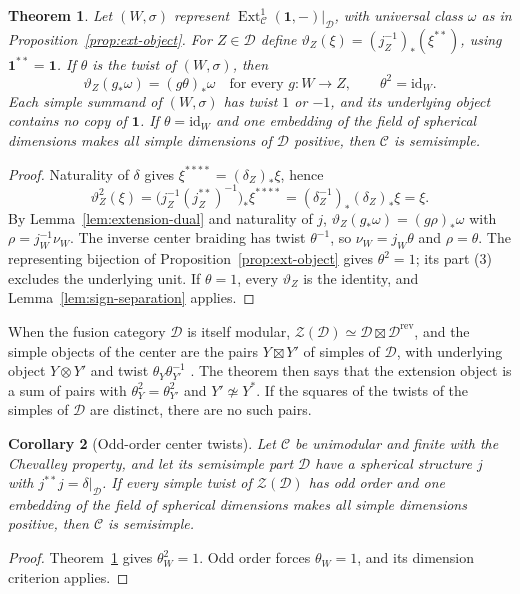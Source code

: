 \documentclass[11pt,reqno]{amsart}
\newtheorem{theorem}{Theorem}[section]
\newtheorem{corollary}[theorem]{Corollary}
\theoremstyle{definition}
\newcommand{\Ext}{\operatorname{Ext}}
\newcommand{\one}{\mathbf 1}
\newcommand{\C}{\mathcal C}
\begin{document}
\begin{theorem}\label{thm:radford}
Let $(W,\sigma)$ represent $\Ext^1_{\C}(\one,-)|_{\mathcal D}$, with universal class $\omega$ as in Proposition~\ref{prop:ext-object}. For $Z\in\mathcal D$ define $\vartheta_Z(\xi)=(j_Z^{-1})_*(\xi^{**})$, using $\one^{**}=\one$. If $\theta$ is the twist of $(W,\sigma)$, then
\[
 \vartheta_Z(g_*\omega)=(g\theta)_*\omega
 \quad\text{for every }g:W\to Z,\qquad \theta^2=\mathrm{id}_W.
\]
Each simple summand of $(W,\sigma)$ has twist $1$ or $-1$, and its underlying object contains no copy of $\one$. If $\theta=\mathrm{id}_W$ and one embedding of the field of spherical dimensions makes all simple dimensions of $\mathcal D$ positive, then $\C$ is semisimple.
\end{theorem}
\begin{proof}
Naturality of $\delta$ gives $\xi^{****}=(\delta_Z)_*\xi$, hence
\[
 \vartheta_Z^2(\xi)
 =\bigl(j_Z^{-1}(j_Z^{**})^{-1}\bigr)_*\xi^{****}
 =(\delta_Z^{-1})_*(\delta_Z)_*\xi=\xi.
\]
By Lemma~\ref{lem:extension-dual} and naturality of $j$,
$\vartheta_Z(g_*\omega)=(g\rho)_*\omega$ with $\rho=j_W^{-1}\nu_W$.
The inverse center braiding has twist $\theta^{-1}$, so $\nu_W=j_W\theta$ and $\rho=\theta$. The representing bijection of Proposition~\ref{prop:ext-object} gives $\theta^2=1$; its part (3) excludes the underlying unit. If $\theta=1$, every $\vartheta_Z$ is the identity, and Lemma~\ref{lem:sign-separation} applies.
\end{proof}

When the fusion category $\mathcal D$ is itself modular, $\mathcal Z(\mathcal D)\simeq\mathcal D\boxtimes\mathcal D^{\mathrm{rev}}$, and the simple objects of the center are the pairs $Y\boxtimes Y'$ of simples of $\mathcal D$, with underlying object $Y\otimes Y'$ and twist $\theta_Y\theta_{Y'}^{-1}$ \cite[Proposition~8.20.12]{EGNO}. The theorem then says that the extension object is a sum of pairs with $\theta_Y^2=\theta_{Y'}^2$ and $Y'\not\simeq Y^*$. If the squares of the twists of the simples of $\mathcal D$ are distinct, there are no such pairs.

\begin{corollary}[Odd-order center twists]\label{cor:odd-center-twists}
Let $\C$ be unimodular and finite with the Chevalley property, and let its semisimple part $\mathcal D$ have a spherical structure $j$ with $j^{**}j=\delta|_{\mathcal D}$. If every simple twist of $\mathcal Z(\mathcal D)$ has odd order and one embedding of the field of spherical dimensions makes all simple dimensions positive, then $\C$ is semisimple.
\end{corollary}
\begin{proof}
Theorem~\ref{thm:radford} gives $\theta_W^2=1$. Odd order forces $\theta_W=1$, and its dimension criterion applies.
\end{proof}
\end{document}
